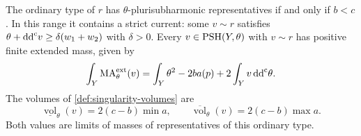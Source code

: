 \begin{theorem}\label{thm:nonclosed-ruled-ordinary-volumes}
The ordinary type of $r$ has $\theta$-plurisubharmonic representatives if and only if $b<c$. In this range it contains a strict current: some $v\sim r$ satisfies $\theta+\mathrm{dd}^{\mathrm{c}} v\geq\delta(w_1+w_2)$ with $\delta>0$. Every $v\in\mathrm{PSH}(Y,\theta)$ with $v\sim r$ has positive finite extended mass, given by
\begin{equation}\label{eq:nonclosed-ruled-affine-mass}
 \int_Y\mathrm{MA}^{\mathrm{ext}}_\theta(v)
   =\int_Y\theta^2-2b a(p)+2\int_Yv\,\mathrm{dd}^{\mathrm{c}}\theta.
\end{equation}
The volumes of \cref{def:singularity-volumes} are
\begin{equation}\label{eq:nonclosed-ruled-ordinary-volumes}
 \underline{\operatorname{vol}}_\theta(v)=2(c-b)\min a,
 \qquad
 \overline{\operatorname{vol}}_\theta(v)=2(c-b)\max a.
\end{equation}
Both values are limits of masses of representatives of this ordinary type.
\end{theorem}
